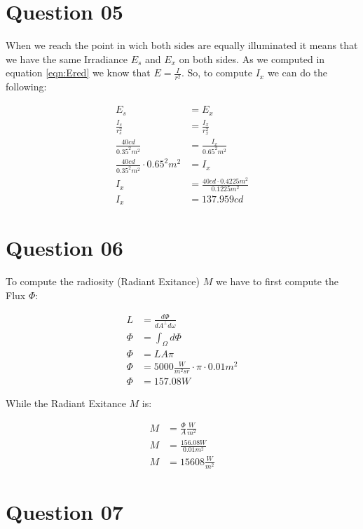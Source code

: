   \section{Question 05}
    
    When we reach the point in wich both sides are equally illuminated it means that we have the same Irradiance $E_s$ and $E_x$ on both sides.
    As we computed in equation \ref{eqn:Ered} we know that $E = \frac{I}{r^2}$. So, to compute $I_x$ we can do the following:

    \begin{align}
      E_s &= E_x \\
      \frac{I_s}{r_{s}^2} &= \frac{I_x}{r_{x}^2}      \\
      \frac{40cd}{0.35^2m^2} &= \frac{I_x}{0.65^2m^2} \\
      \frac{40cd}{0.35^2m^2} \cdot 0.65^2m^2 &= I_x   \\
      I_x &= \frac{40cd \cdot 0.4225 m^2}{0.1225m^2}  \\
      I_x &= 137.959 cd
    \end{align}

  \section{Question 06}

    To compute the radiosity (Radiant Exitance) $M$ we have to first compute the Flux $\Phi$:
    
    \begin{align}
      L &= \frac{d\Phi}{dA^{\perp}d\omega}        \\
      \Phi &= \int_{\Omega}^{}d\Phi   \\
      \Phi &= LA\pi                   \\
      \Phi &= 5000 \frac{W}{m^2 sr} \cdot \pi \cdot 0.01 m^2 \\
      \Phi &= 157.08 W
    \end{align}

    While the Radiant Exitance $M$ is:

    \begin{align}
      M &= \frac{\Phi}{A}\frac{W}{m^2}  \\
      M &= \frac{156.08 W}{0.01 m^2}    \\
      M &= 15608 \frac{W}{m^2}
    \end{align}

  \section{Question 07}

    
